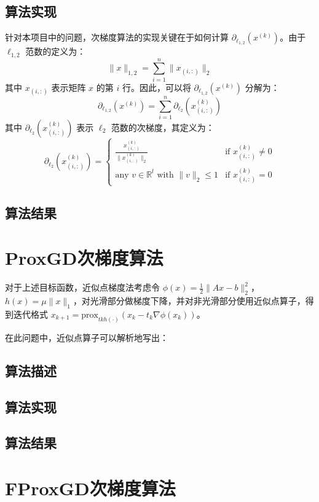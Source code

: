 \documentclass[journal, a4paper]{IEEEtran}
\begin{document}
\subsection{\textbf{算法实现}}

针对本项目中的问题，次梯度算法的实现关键在于如何计算 $\partial_{\ell_{1,2}}(x^{(k)})$。由于 $\ell_{1,2}$ 范数的定义为：
\begin{equation*}\label{eq:l12}
    \lVert x \rVert_{1,2} = \sum_{i=1}^{n} \lVert x_{(i, :)} \rVert_2
\end{equation*}
其中 $x_{(i, :)}$ 表示矩阵 $x$ 的第 $i$ 行。因此，可以将 $\partial_{\ell_{1,2}}(x^{(k)})$ 分解为：
\begin{equation*}\label{eq:subgrad}
    \partial_{\ell_{1,2}}(x^{(k)}) = \sum_{i=1}^{n} \partial_{\ell_2}(x_{(i, :)}^{(k)})
\end{equation*}
其中 $\partial_{\ell_2}(x_{(i, :)}^{(k)})$ 表示 $\ell_2$ 范数的次梯度，其定义为：
\begin{equation*}\label{eq:l2subgrad}
    \partial_{\ell_2}(x_{(i, :)}^{(k)}) = \begin{cases}
        \frac{x_{(i, :)}^{(k)}}{\lVert x_{(i, :)}^{(k)} \rVert_2} & \text{if } x_{(i, :)}^{(k)} \neq 0 \\
        \text{any } v \in \mathbb{R}^l \text{ with } \lVert v \rVert_2 \leq 1 & \text{if } x_{(i, :)}^{(k)} = 0
    \end{cases}
\end{equation*}


\subsection{\textbf{算法结果}}

\section{\textbf{ProxGD次梯度算法}}

对于上述目标函数，近似点梯度法考虑令 $\phi(x)=\frac{1}{2}\|Ax-b\|_2^2$，$h(x)=\mu\|x\|_1$，对光滑部分做梯度下降，并对非光滑部分使用近似点算子，得到迭代格式 $x_{k+1}=\text{prox}_{tkh(\cdot)}(x_k-t_k\nabla\phi(x_k))$。

在此问题中，近似点算子可以解析地写出：

\subsection{\textbf{算法描述}}

\subsection{\textbf{算法实现}}

\subsection{\textbf{算法结果}}

\section{\textbf{FProxGD次梯度算法}}








\end{document}
